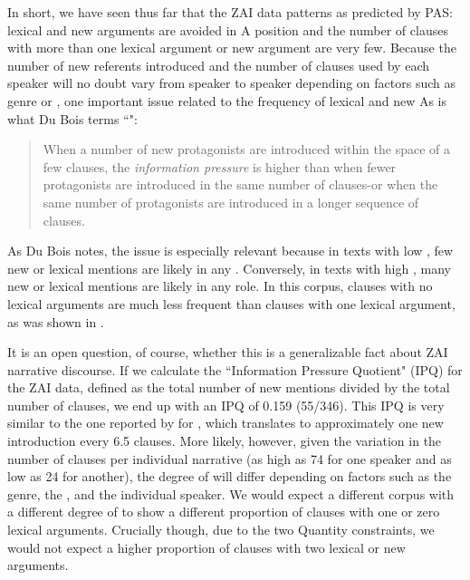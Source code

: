 In short, we have seen thus far that the ZAI data patterns as predicted by PAS: lexical and new arguments are avoided in A position and the number of clauses with more than one lexical argument or new argument are very few. Because the number of new referents introduced and the number of clauses used by each speaker will no doubt vary from speaker to speaker depending on factors such as genre or , one important issue related to the frequency of lexical and new As is what Du Bois terms ``": 

\begin{quote}
When a number of new protagonists are introduced within the space of a few clauses, the \textit{information pressure} is higher than when fewer protagonists are introduced in the same number of clauses-or when the same number of protagonists are introduced in a longer sequence of clauses. \citep[834 (italics mine)]{dubois1987}
\end{quote}

As Du Bois notes, the issue is especially relevant because in texts with low , few new or lexical mentions are likely in any . Conversely, in texts with high , many new or lexical mentions are likely in any role. In this corpus, clauses with no lexical arguments are much less frequent than clauses with one lexical argument, as was shown in .

It is an open question, of course, whether this is a generalizable fact about ZAI narrative discourse. If we calculate the ``Information Pressure Quotient" (IPQ) for the ZAI data, defined as the total number of new mentions divided by the total number of clauses, we end up with an IPQ of 0.159 (55/346). This IPQ is very similar to the one reported by \citet[834]{dubois1987} for , which translates to approximately one new introduction every 6.5 clauses. More likely, however, given the variation in the number of clauses per individual narrative (as high as 74 for one speaker and as low as 24 for another), the degree of  will differ depending on factors such as the genre, the , and the individual speaker. We would expect a different corpus with a different degree of  to show a different proportion of clauses with one or zero lexical arguments. Crucially though, due to the two Quantity constraints, we would not expect a higher proportion of clauses with two lexical or new arguments.

